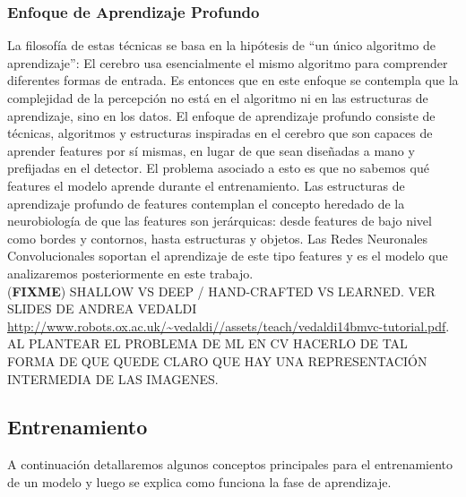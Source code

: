 \documentclass[a4paper,11pt,spanish]{book}
\newcommand*{\FIXME}[1]{{(\textbf{FIXME}) {#1}}}
\begin{document}
	\subsubsection{Enfoque de Aprendizaje Profundo} 
	  La filosofía de estas técnicas se basa en la hipótesis de “un único algoritmo de aprendizaje”: El cerebro usa esencialmente el mismo algoritmo para comprender diferentes formas de entrada. 
	  Es entonces que en este enfoque se contempla que la complejidad de la percepción no está en el algoritmo ni en las estructuras de aprendizaje, sino en los datos. 
	  El enfoque de aprendizaje profundo consiste de técnicas, algoritmos y estructuras inspiradas en el cerebro que son capaces de aprender features por sí mismas, 
	  en lugar de que sean diseñadas a mano y prefijadas en el detector. El problema asociado a esto es que no sabemos qué features el modelo aprende durante el entrenamiento.
	  Las estructuras de aprendizaje profundo de features contemplan el concepto heredado de la neurobiología de que las features son jerárquicas: 
	  desde features de bajo nivel como bordes y contornos, hasta estructuras y objetos. Las Redes Neuronales Convolucionales soportan el aprendizaje de este tipo features 
	  y es el modelo que analizaremos posteriormente en este trabajo.\\
	 \FIXME{SHALLOW VS DEEP / HAND-CRAFTED VS LEARNED. VER SLIDES DE ANDREA VEDALDI
            \url{http://www.robots.ox.ac.uk/~vedaldi//assets/teach/vedaldi14bmvc-tutorial.pdf}.
            AL PLANTEAR EL PROBLEMA DE ML EN CV HACERLO DE TAL FORMA DE QUE QUEDE CLARO QUE HAY UNA REPRESENTACIÓN INTERMEDIA DE LAS IMAGENES.}
       
      \subsection{Entrenamiento}
	A continuación detallaremos algunos conceptos principales para el entrenamiento de un modelo y luego se explica como funciona la fase de aprendizaje.
\end{document}
